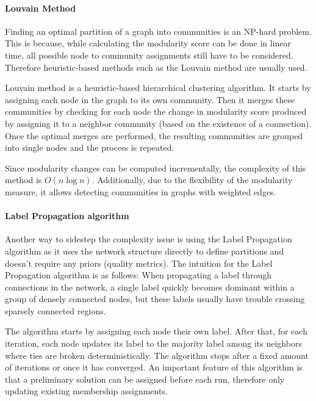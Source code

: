 \documentclass[
acmsmall,
nonacm,
screen,
acmthm]{acmart}
\begin{document}
\hypertarget{louvain-method}{%
\paragraph{Louvain Method}\label{louvain-method}}

Finding an optimal partition of a graph into communities is an NP-hard
problem. This is because, while calculating the modularity score can be
done in linear time, all possible node to community assignments still
have to be considered. Therefore heuristic-based methods such as the
Louvain method are usually used.

Louvain method \citep{blondelFastUnfoldingCommunities2008} is a
heuristic-based hierarchical clustering algorithm. It starts by
assigning each node in the graph to its own community. Then it merges
these communities by checking for each node the change in modularity
score produced by assigning it to a neighbor community (based on the
existence of a connection). Once the optimal merges are performed, the
resulting communities are grouped into single nodes and the process is
repeated.

Since modularity changes can be computed incrementally, the complexity
of this method is \(O\left(n \log n\right)\). Additionally, due to the
flexibility of the modularity measure, it allows detecting communities
in graphs with weighted edges.

\hypertarget{label-propagation-algorithm}{%
\paragraph{Label Propagation
algorithm}\label{label-propagation-algorithm}}

Another way to sidestep the complexity issue is using the Label
Propagation algorithm as it uses the network structure directly to
define partitions and doesn't require any priors (quality metrics). The
intuition for the Label Propagation algorithm is as follows: When
propagating a label through connections in the network, a single label
quickly becomes dominant within a group of densely connected nodes, but
these labels usually have trouble crossing sparsely connected regions.

The algorithm starts by assigning each node their own label. After that,
for each iteration, each node updates its label to the majority label
among its neighbors where ties are broken deterministically. The
algorithm stops after a fixed amount of iterations or once it has
converged. An important feature of this algorithm is that a preliminary
solution can be assigned before each run, therefore only updating
existing membership assignments.
\end{document}
